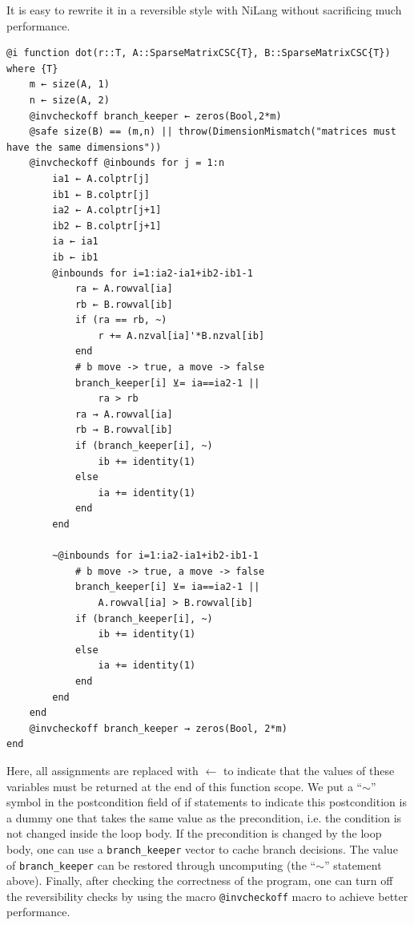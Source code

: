 \documentclass{article}
\newcommand{\<}{\langle}
\renewcommand{\>}{\rangle}
\theoremstyle{definition}\newtheorem{definition}{\textit{Definition}}
\begin{document}
It is easy to rewrite it in a reversible style with NiLang without sacrificing much performance.

\begin{minipage}{\columnwidth}
\begin{lstlisting}[multicols=2]
@i function dot(r::T, A::SparseMatrixCSC{T}, B::SparseMatrixCSC{T}) where {T}
    m ← size(A, 1)
    n ← size(A, 2)
    @invcheckoff branch_keeper ← zeros(Bool,2*m)
    @safe size(B) == (m,n) || throw(DimensionMismatch("matrices must have the same dimensions"))
    @invcheckoff @inbounds for j = 1:n
        ia1 ← A.colptr[j]
        ib1 ← B.colptr[j]
        ia2 ← A.colptr[j+1]
        ib2 ← B.colptr[j+1]
        ia ← ia1
        ib ← ib1
        @inbounds for i=1:ia2-ia1+ib2-ib1-1
            ra ← A.rowval[ia]
            rb ← B.rowval[ib]
            if (ra == rb, ~)
                r += A.nzval[ia]'*B.nzval[ib]
            end
            # b move -> true, a move -> false
            branch_keeper[i] ⊻= ia==ia2-1 ||
                ra > rb
            ra → A.rowval[ia]
            rb → B.rowval[ib]
            if (branch_keeper[i], ~)
                ib += identity(1)
            else
                ia += identity(1)
            end
        end

        ~@inbounds for i=1:ia2-ia1+ib2-ib1-1
            # b move -> true, a move -> false
            branch_keeper[i] ⊻= ia==ia2-1 ||
                A.rowval[ia] > B.rowval[ib]
            if (branch_keeper[i], ~)
                ib += identity(1)
            else
                ia += identity(1)
            end
        end
    end
    @invcheckoff branch_keeper → zeros(Bool, 2*m)
end
\end{lstlisting}
\end{minipage}

Here, all assignments are replaced with \texttt{$\leftarrow$} to indicate that the values of these variables must be returned at the end of this function scope.
We put a ``\texttt{$\sim$}'' symbol in the postcondition field of if statements to indicate this postcondition is a dummy one that takes the same value as the precondition, i.e. the condition is not changed inside the loop body.
If the precondition is changed by the loop body, one can use a \texttt{branch\_keeper} vector to cache branch decisions. The value of \texttt{branch\_keeper} can be restored through uncomputing (the ``$\sim$'' statement above).
Finally, after checking the correctness of the program, one can turn off the reversibility checks by using the macro \texttt{@invcheckoff} macro to achieve better performance.
\end{document}
